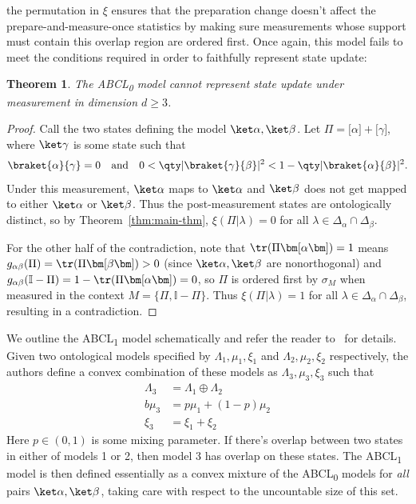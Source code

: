 \documentclass[%
 reprint,
superscriptaddress,
nofootinbib,
 amsmath,amssymb,
 prx, 
 accepted=2019-09-27,
]{quantumarticle}
\newtheorem{theorem}{Theorem}
\newcommand{\Id}{\mathbb{I}}
\newcommand{\abclz}{{ABCL\textsubscript{0}} }
\newcommand{\abclo}{{ABCL\textsubscript{1}} }
\newcommand{\proj}[1]{{\bm[}#1{\bm]}}
\begin{document}
the permutation in $\xi$ ensures that the preparation change doesn't
affect the prepare-and-measure-once statistics by making sure
measurements whose support must contain this overlap region are
ordered first. Once again, this model fails to meet the conditions
required in order to faithfully represent state update:
\begin{theorem}
  The \abclz model cannot represent state update under measurement in
  dimension $d\geq3$.
\end{theorem}
\begin{proof}
  Call the two states defining the model $\ket\alpha,\ket\beta$. Let
  $\Pi=\proj\alpha+\proj\gamma$, where $\ket\gamma$ is some state such
  that
  \begin{equation}
    \braket{\alpha}{\gamma}=0 \quad\text{and}\quad
    0<\qty|\braket{\gamma}{\beta}|^2<1-\qty|\braket{\alpha}{\beta}|^2.\label{eq:22}
  \end{equation}
  Under this measurement, $\ket\alpha$ maps to $\ket\alpha$ and
  $\ket\beta$ does not get mapped to either $\ket\alpha$ or
  $\ket\beta$. Thus the post-measurement states are ontologically
  distinct, so by Theorem~\ref{thm:main-thm}, $\xi(\Pi|\lambda)=0$ for
  all $\lambda\in\Delta_\alpha\cap\Delta_\beta$.

  For the other half of the contradiction, note that
  $\tr(\Pi\proj\alpha)=1$ means
  $g_{\alpha\beta}(\Pi)=\tr(\Pi\proj \beta)>0$ (since
  $\ket\alpha,\ket\beta$ are nonorthogonal) and
  $g_{\alpha\beta}(\Id-\Pi)=1-\tr(\Pi\proj \alpha)=0$, so $\Pi$ is
  ordered first by $\sigma_M$ when measured in the context
  $M=\{\Pi,\Id-\Pi\}$. Thus $\xi(\Pi|\lambda)=1$ for all
  $\lambda\in\Delta_\alpha\cap\Delta_\beta$, resulting in a
  contradiction.
\end{proof}

We outline the \abclo model schematically and refer the reader
to~\cite{Leiferquantumstatereal2014,Aaronsonpsepistemictheoriesrole2013}
for details. Given two ontological models specified by
$\Lambda_1,\mu_1,\xi_1$ and $\Lambda_2,\mu_2,\xi_2$ respectively, the
authors define a convex combination of these models as
$\Lambda_3,\mu_3,\xi_3$ such that
\begin{align}
  \label{eq:33}
  \Lambda_3&=\Lambda_1\oplus\Lambda_2\nonumber\\
b  \mu_3&= p\mu_1+(1-p)\mu_2\nonumber\\
  \xi_3&= \xi_1+\xi_2
\end{align}
Here $p\in(0,1)$ is some mixing parameter. If there's overlap between
two states in either of models 1 or 2, then model 3 has overlap on
these states. The \abclo model is then defined essentially as a convex
mixture of the \abclz models for \emph{all} pairs
$\ket\alpha,\ket\beta$, taking care with respect to the uncountable
size of this set.
\end{document}

